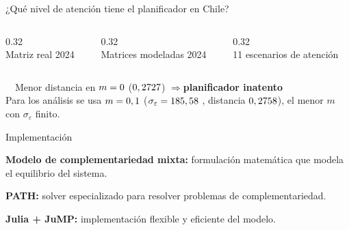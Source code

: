 \documentclass[xcolor=dvipsnames]{beamer}
\newcommand{\filaIcono}[3]{%
  \begin{tcolorbox}[simbolo=#1, halign=left, width=\linewidth]
    \begin{minipage}[c]{0.085\linewidth}\centering{\color{#1}\Large #2}\end{minipage}%
    \hspace{0.02\linewidth}%
    \begin{minipage}[c]{0.855\linewidth}#3\end{minipage}
  \end{tcolorbox}}
\begin{document}
\begin{frame}{¿Qué nivel de atención tiene el planificador en Chile?}

\vspace{0.1cm}
\begin{tcolorbox}[tarjeta=ClimateGreen, title={\faBullseye\ \ 1. Metodología de ajuste}]
\begin{columns}[c]
\begin{column}{0.32\textwidth}\\{\scriptsize Matriz real 2024}\end{column}
\begin{column}{0.32\textwidth}\centering{\color{ClimateGreen}\faLayerGroup}\\{\scriptsize Matrices modeladas 2024}\end{column}
\begin{column}{0.32\textwidth}\centering{\color{ClimateGreen}\faUsers}\\{\scriptsize 11 escenarios de atención}\end{column}
\end{columns}
\end{tcolorbox}

\vspace{0.1cm}
\begin{tcolorbox}[tarjeta=SoftBlue, title={\faSearch\ \ 2. Comparación}]
\end{tcolorbox}

\vspace{0.1cm}
\begin{tcolorbox}[tarjeta=DeepBlue, title={\faChartBar\ \ 3. Resultado clave}]
\centering
{\faCheckCircle}\ \ Menor distancia en $m = 0$ ($0,2727$)
\quad$\Rightarrow$\quad \textbf{planificador inatento}\\[2pt]
{\scriptsize Para los análisis se usa $m = 0,1$
($\sigma_\varepsilon = 185,58$ \unidadMt, distancia $0,2758$),
el menor $m$ con $\sigma_\varepsilon$ finito.}
\end{tcolorbox}

\end{frame}


\begin{frame}{Implementación}

\vspace{0.3cm}
\filaIcono{ClimateGreen}{\faPuzzlePiece}{\textbf{Modelo de complementariedad mixta:} formulación matemática que modela el equilibrio del sistema.}

\vspace{0.3cm}
\filaIcono{DeepBlue}{\faCogs}{\textbf{PATH:} solver especializado para resolver problemas de complementariedad.}

\vspace{0.3cm}
\filaIcono{MediumGray}{\faCode}{\textbf{Julia + JuMP:} implementación flexible y eficiente del modelo.}

\end{frame}
\end{document}
